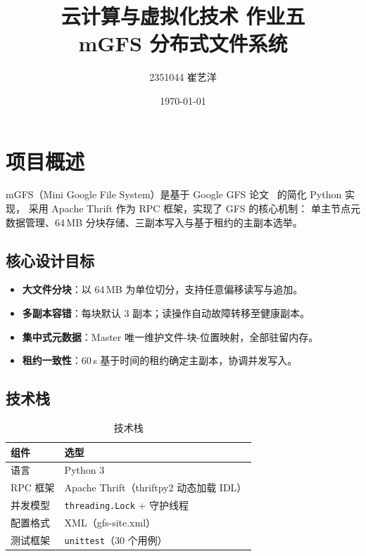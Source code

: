 \documentclass[10pt,a4paper]{article}
\title{
  \vspace{-1cm}
  {\Large 云计算与虚拟化技术 \quad 作业五}\\[0.8em]
  {\huge \textbf{mGFS 分布式文件系统}}\\[0.4em]
}
\author{2351044 崔艺洋}
\date{\today}
\begin{document}
\maketitle
\tableofcontents
\newpage

\section{项目概述}

mGFS（Mini Google File System）是基于 Google GFS 论文~\cite{gfs2003} 的简化 Python 实现，
采用 Apache Thrift 作为 RPC 框架，实现了 GFS 的核心机制：
单主节点元数据管理、64\,MB 分块存储、三副本写入与基于租约的主副本选举。

\subsection{核心设计目标}

\begin{itemize}[leftmargin=2em]
  \item \textbf{大文件分块}：以 64\,MB 为单位切分，支持任意偏移读写与追加。
  \item \textbf{多副本容错}：每块默认 3 副本；读操作自动故障转移至健康副本。
  \item \textbf{集中式元数据}：Master 唯一维护文件-块-位置映射，全部驻留内存。
  \item \textbf{租约一致性}：60\,s 基于时间的租约确定主副本，协调并发写入。
\end{itemize}

\subsection{技术栈}

\begin{table}[H]
\centering
\caption{技术栈}
\begin{tabularx}{\textwidth}{lX}
\toprule
\textbf{组件} & \textbf{选型} \\
\midrule
语言        & Python 3 \\
RPC 框架    & Apache Thrift（thriftpy2 动态加载 IDL）\\
并发模型    & \texttt{threading.Lock} + 守护线程 \\
配置格式    & XML（gfs-site.xml）\\
测试框架    & \texttt{unittest}（30 个用例）\\
\bottomrule
\end{tabularx}
\end{table}
\end{document}
